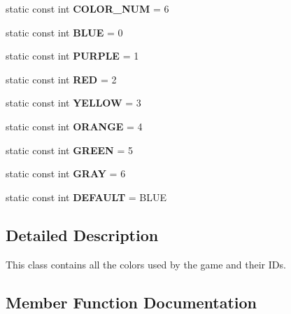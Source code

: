 \begin{DoxyCompactItemize}
static const int {\bfseries C\+O\+L\+O\+R\+\_\+\+N\+UM} = 6
\item 
\mbox{\label{class_spectrum_colors_a9aefcb909cae9150ec4a8e6fa72e38e8}} 
static const int {\bfseries B\+L\+UE} = 0
\item 
\mbox{\label{class_spectrum_colors_a00be6f0267411358c8203a6fb79fddee}} 
static const int {\bfseries P\+U\+R\+P\+LE} = 1
\item 
\mbox{\label{class_spectrum_colors_a704b511faaafb84095aadd63725caa32}} 
static const int {\bfseries R\+ED} = 2
\item 
\mbox{\label{class_spectrum_colors_ac789686178070009f931b71c10251125}} 
static const int {\bfseries Y\+E\+L\+L\+OW} = 3
\item 
\mbox{\label{class_spectrum_colors_ad528e086d107fcd4979a4bbc7962f07e}} 
static const int {\bfseries O\+R\+A\+N\+GE} = 4
\item 
\mbox{\label{class_spectrum_colors_aeb7542142facb82e88da69db94cc51b7}} 
static const int {\bfseries G\+R\+E\+EN} = 5
\item 
\mbox{\label{class_spectrum_colors_a80b679f78d68133767cff025300379c5}} 
static const int {\bfseries G\+R\+AY} = 6
\item 
\mbox{\label{class_spectrum_colors_a35a087837d0bb17306cc7b601eba6cba}} 
static const int {\bfseries D\+E\+F\+A\+U\+LT} = B\+L\+UE
\end{DoxyCompactItemize}


\subsection{Detailed Description}
This class contains all the colors used by the game and their I\+Ds. 

\subsection{Member Function Documentation}
\mbox{\label{class_spectrum_colors_a7a0be9b9aa0b40fe03b956263671c861}} 
